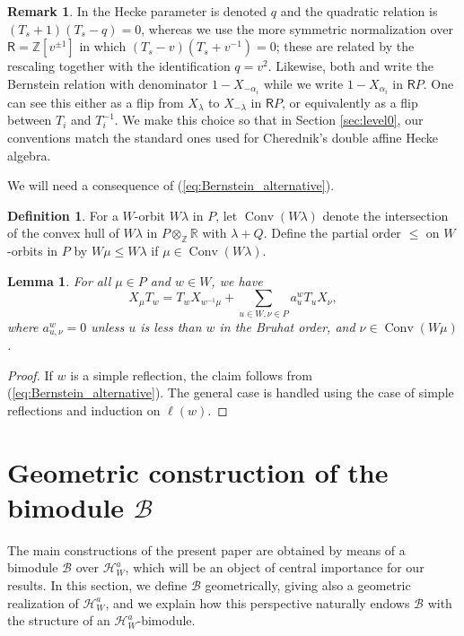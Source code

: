 \documentclass{amsart}
\newcommand{\Ring}{\mathsf{R}}
\newcommand{\Ha}{\mathcal{H}_{W}^a}
\newcommand{\B}{\mathcal{B}}
\newtheorem{Lem}[Thm]{Lemma}
\theoremstyle{definition}
\newtheorem{defi}[Thm]{Definition}
\newtheorem{Rem}[Thm]{Remark}
\numberwithin{equation}{section}
\begin{document}
\begin{Rem}\label{rem:comparison}
In \cite{GG} the Hecke parameter is denoted \(q\) and the quadratic relation is \((T_s+1)(T_s-q)=0\), whereas we use the more symmetric normalization over \(\Ring=\mathbb Z[v^{\pm1}]\) in which \((T_s-v)(T_s+v^{-1})=0\); these are related by the rescaling together with the identification \(q=v^2\). Likewise, both \cite{L83} and \cite{GG} write the Bernstein relation with denominator \(1-X_{-\alpha_i}\) while we write \(1-X_{\alpha_i}\) in \(\Ring P\). One can see this either as a flip from $X_\lambda$ to $X_{-\lambda}$ in $\Ring P$, or equivalently as a flip between $T_i$ and $T_i^{-1}$. We make this choice so that in Section \ref{sec:level0}, our conventions match the standard ones used for Cherednik's double affine Hecke algebra.
\end{Rem}

We will need a consequence of (\ref{eq:Bernstein_alternative}).

\begin{defi}\label{defi:Conv}
For a $W$-orbit $W\lambda$ in $P$, let $\operatorname{Conv}(W\lambda)$ denote the intersection of the convex hull of $W\lambda$ in $P\otimes_{\mathbb{Z}}\mathbb{R}$ with $\lambda+Q$. Define the partial order $\leqslant$ on $W$-orbits in $P$ by $W\mu\leqslant W\lambda$ if $\mu\in \operatorname{Conv}(W\lambda)$.
\end{defi}


\begin{Lem}\label{Lem:Bernstein_consequence}
For all $\mu\in P$ and $w\in W$, we have
$$X_\mu T_w=T_w X_{w^{-1}\mu}+\sum_{u\in W, \nu\in P}a_u^w T_u X_\nu,$$
where $a_{u,\nu}^w=0$ unless $u$ is less than $w$ in the Bruhat order, and $\nu\in \operatorname{Conv}(W\mu)$.
\end{Lem}
\begin{proof}
If $w$ is a simple reflection, the claim follows from (\ref{eq:Bernstein_alternative}). The general case is handled using the case of simple reflections and induction on $\ell(w)$.
\end{proof}

\section{Geometric construction of the bimodule $\B$}\label{sec:geometric}

The main constructions of the present paper are obtained by means of a bimodule $\B$ over $\Ha$, which will be an object of central importance for our results. In this section, we define $\B$ geometrically, giving also a geometric realization of $\Ha$, and we explain how this perspective naturally endows $\B$ with the structure of an $\Ha$-bimodule.
\end{document}
